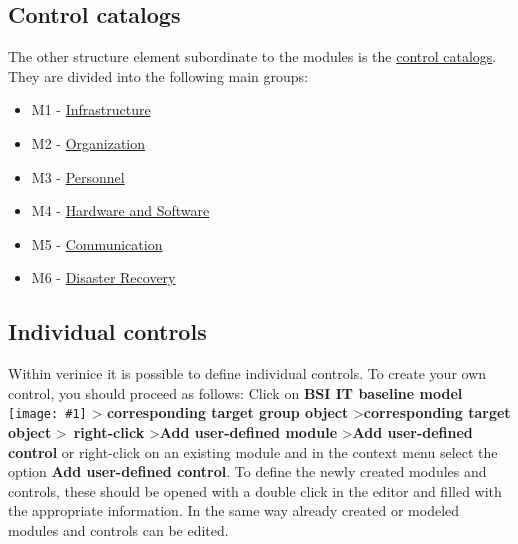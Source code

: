 \documentclass[a4paper,10pt]{book}
\newcommand{\icon}[1]{\texttt{[image: \#1]}}
\begin{document}
\subsection{Control catalogs}
The other structure element subordinate to the modules is the \href{https://www.bsi.bund.de/cln_156/DE/Themen/weitereThemen/ITGrundschutzKataloge/Inhalt/Massnahmenkataloge/massnahmenkataloge_node.html}{control catalogs}. They are divided into the following main groups:
\begin{itemize}
\item M1 - \href{https://www.bsi.bund.de/cln_156/DE/Themen/weitereThemen/ITGrundschutzKataloge/Inhalt/Massnahmenkataloge/M1Infrastruktur/m1infrastruktur_node.html}{Infrastructure}
\item M2 - \href{https://www.bsi.bund.de/cln_156/DE/Themen/weitereThemen/ITGrundschutzKataloge/Inhalt/Massnahmenkataloge/M2Organisation/m2organisation_node.html}{Organization}
\item M3 - \href{https://www.bsi.bund.de/cln_156/DE/Themen/weitereThemen/ITGrundschutzKataloge/Inhalt/Massnahmenkataloge/M3Personal/m3personal_node.html}{Personnel}
\item M4 - \href{https://www.bsi.bund.de/cln_156/DE/Themen/weitereThemen/ITGrundschutzKataloge/Inhalt/Massnahmenkataloge/M4HardwareundSoftware/m4hardwareundsoftware_node.html}{Hardware and Software}
\item M5 - \href{https://www.bsi.bund.de/cln_156/DE/Themen/weitereThemen/ITGrundschutzKataloge/Inhalt/Massnahmenkataloge/M5Kommunikation/m5kommunikation_node.html}{Communication}
\item M6 - \href{https://www.bsi.bund.de/cln_156/DE/Themen/weitereThemen/ITGrundschutzKataloge/Inhalt/Massnahmenkataloge/M6Notfallversorgung/m6notfallvorsorge_node.html}{Disaster Recovery}
\end{itemize}

\subsection{Individual controls}
Within verinice it is possible to define individual controls. To create your own control, you should proceed as follows:
Click on \textbf{BSI IT baseline model} \icon{Icon/GS_Modell.png} \textgreater
\textbf{corresponding target group object} \textgreater \textbf{corresponding target object} \textgreater\ \textbf{right-click} \textgreater \textbf{Add user-defined module} \textgreater \textbf{Add user-defined control} or right-click on an existing module and in the context menu select the option \textbf{Add user-defined control}.
To define the newly created modules and controls, these should be opened with a double click in the editor and filled with the appropriate information. In the same way already created or modeled modules and controls can be edited.
\end{document}
